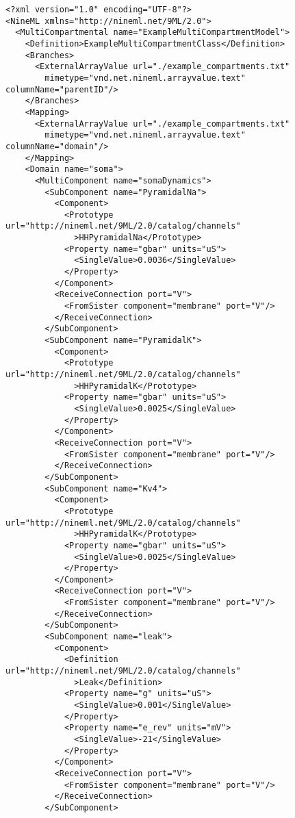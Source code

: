 \documentclass[draftspec]{ninemlspec}
\begin{document}
\begin{lstlisting}
<?xml version="1.0" encoding="UTF-8"?>
<NineML xmlns="http://nineml.net/9ML/2.0">
  <MultiCompartmental name="ExampleMultiCompartmentModel">
    <Definition>ExampleMultiCompartmentClass</Definition>
    <Branches>
      <ExternalArrayValue url="./example_compartments.txt"
        mimetype="vnd.net.nineml.arrayvalue.text" columnName="parentID"/>
    </Branches>
    <Mapping>
      <ExternalArrayValue url="./example_compartments.txt"
        mimetype="vnd.net.nineml.arrayvalue.text" columnName="domain"/>
    </Mapping>
    <Domain name="soma">
      <MultiComponent name="somaDynamics">
        <SubComponent name="PyramidalNa">
          <Component>
            <Prototype url="http://nineml.net/9ML/2.0/catalog/channels"
              >HHPyramidalNa</Prototype>
            <Property name="gbar" units="uS">
              <SingleValue>0.0036</SingleValue>
            </Property>
          </Component>
          <ReceiveConnection port="V">
            <FromSister component="membrane" port="V"/>
          </ReceiveConnection>
        </SubComponent>
        <SubComponent name="PyramidalK">
          <Component>
            <Prototype url="http://nineml.net/9ML/2.0/catalog/channels"
              >HHPyramidalK</Prototype>
            <Property name="gbar" units="uS">
              <SingleValue>0.0025</SingleValue>
            </Property>
          </Component>
          <ReceiveConnection port="V">
            <FromSister component="membrane" port="V"/>
          </ReceiveConnection>
        </SubComponent>
        <SubComponent name="Kv4">
          <Component>
            <Prototype url="http://nineml.net/9ML/2.0/catalog/channels"
              >HHPyramidalK</Prototype>
            <Property name="gbar" units="uS">
              <SingleValue>0.0025</SingleValue>
            </Property>
          </Component>
          <ReceiveConnection port="V">
            <FromSister component="membrane" port="V"/>
          </ReceiveConnection>
        </SubComponent>
        <SubComponent name="leak">
          <Component>
            <Definition url="http://nineml.net/9ML/2.0/catalog/channels"
              >Leak</Definition>
            <Property name="g" units="uS">
              <SingleValue>0.001</SingleValue>
            </Property>
            <Property name="e_rev" units="mV">
              <SingleValue>-21</SingleValue>
            </Property>
          </Component>
          <ReceiveConnection port="V">
            <FromSister component="membrane" port="V"/>
          </ReceiveConnection>
        </SubComponent>

\end{lstlisting}
\end{document}
